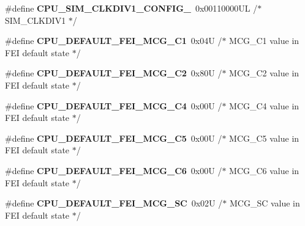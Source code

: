 \begin{DoxyCompactItemize}
\item 
\#define {\bfseries C\+P\+U\+\_\+\+S\+I\+M\+\_\+\+C\+L\+K\+D\+I\+V1\+\_\+\+C\+O\+N\+F\+I\+G\+\_}~0x00110000\+U\+L /$\ast$ S\+I\+M\+\_\+\+C\+L\+K\+D\+I\+V1 $\ast$/\hypertarget{group___c_p_u___config__module_gab35172f2601c09ecf7475e93b5b128d7}{}\label{group___c_p_u___config__module_gab35172f2601c09ecf7475e93b5b128d7}

\item 
\#define {\bfseries C\+P\+U\+\_\+\+D\+E\+F\+A\+U\+L\+T\+\_\+\+F\+E\+I\+\_\+\+M\+C\+G\+\_\+\+C1}~0x04\+U     /$\ast$ M\+C\+G\+\_\+\+C1 value in F\+E\+I default state $\ast$/\hypertarget{group___c_p_u___config__module_ga587649f4ea0ebff77b1c35ea281db3b0}{}\label{group___c_p_u___config__module_ga587649f4ea0ebff77b1c35ea281db3b0}

\item 
\#define {\bfseries C\+P\+U\+\_\+\+D\+E\+F\+A\+U\+L\+T\+\_\+\+F\+E\+I\+\_\+\+M\+C\+G\+\_\+\+C2}~0x80\+U     /$\ast$ M\+C\+G\+\_\+\+C2 value in F\+E\+I default state $\ast$/\hypertarget{group___c_p_u___config__module_ga9f864515403a9a3d6d3774fec08df630}{}\label{group___c_p_u___config__module_ga9f864515403a9a3d6d3774fec08df630}

\item 
\#define {\bfseries C\+P\+U\+\_\+\+D\+E\+F\+A\+U\+L\+T\+\_\+\+F\+E\+I\+\_\+\+M\+C\+G\+\_\+\+C4}~0x00\+U     /$\ast$ M\+C\+G\+\_\+\+C4 value in F\+E\+I default state $\ast$/\hypertarget{group___c_p_u___config__module_ga6abfcdc29e7824555ebdb41f76f8ad5c}{}\label{group___c_p_u___config__module_ga6abfcdc29e7824555ebdb41f76f8ad5c}

\item 
\#define {\bfseries C\+P\+U\+\_\+\+D\+E\+F\+A\+U\+L\+T\+\_\+\+F\+E\+I\+\_\+\+M\+C\+G\+\_\+\+C5}~0x00\+U     /$\ast$ M\+C\+G\+\_\+\+C5 value in F\+E\+I default state $\ast$/\hypertarget{group___c_p_u___config__module_ga14dd42e45f917f8f23feac6322ee6747}{}\label{group___c_p_u___config__module_ga14dd42e45f917f8f23feac6322ee6747}

\item 
\#define {\bfseries C\+P\+U\+\_\+\+D\+E\+F\+A\+U\+L\+T\+\_\+\+F\+E\+I\+\_\+\+M\+C\+G\+\_\+\+C6}~0x00\+U     /$\ast$ M\+C\+G\+\_\+\+C6 value in F\+E\+I default state $\ast$/\hypertarget{group___c_p_u___config__module_ga0b50361c40c593e383a225a572827bb7}{}\label{group___c_p_u___config__module_ga0b50361c40c593e383a225a572827bb7}

\item 
\#define {\bfseries C\+P\+U\+\_\+\+D\+E\+F\+A\+U\+L\+T\+\_\+\+F\+E\+I\+\_\+\+M\+C\+G\+\_\+\+SC}~0x02\+U     /$\ast$ M\+C\+G\+\_\+\+S\+C value in F\+E\+I default state $\ast$/\hypertarget{group___c_p_u___config__module_ga4bd03eea984190a172d288efd0845b83}{}\label{group___c_p_u___config__module_ga4bd03eea984190a172d288efd0845b83}


\end{DoxyCompactItemize}
